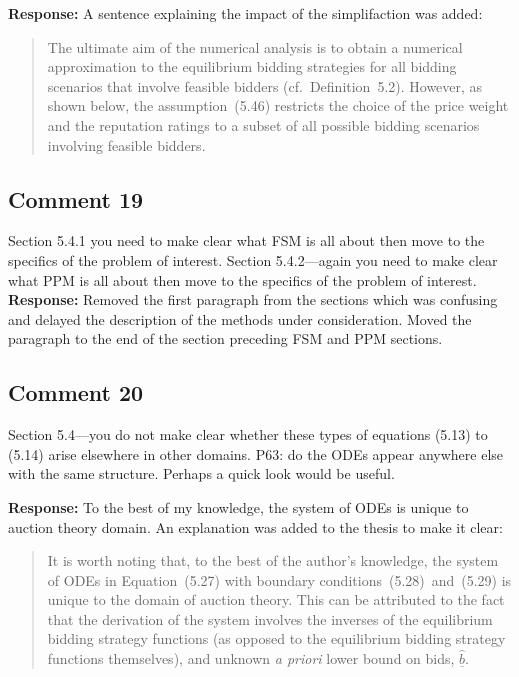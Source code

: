 \documentclass[10pt,a4paper,notitlepage]{article}
\numberwithin{equation}{section}
\begin{document}
\textbf{Response:}
A sentence explaining the impact of the simplifaction was added:
\begin{quote}
The ultimate aim of the numerical analysis is to obtain a numerical approximation to the equilibrium bidding strategies for all bidding scenarios that involve feasible bidders (cf.~Definition~5.2). However, as shown below, the assumption~(5.46) restricts the choice of the price weight and the reputation ratings to a subset of all possible bidding scenarios involving feasible bidders.
\end{quote}

\subsection{Comment 19}
Section 5.4.1 you need to make clear what FSM is all about then move to the specifics of the problem of interest. Section 5.4.2---again you need to make clear what PPM is all about then move to the specifics of the problem of interest.\\[-2ex]

\textbf{Response:}
Removed the first paragraph from the sections which was confusing and delayed the description of the methods under consideration. Moved the paragraph to the end of the section preceding FSM and PPM sections.

\subsection{Comment 20}
Section 5.4---you do not make clear whether these types of equations (5.13) to (5.14) arise elsewhere in other domains. P63: do the ODEs appear anywhere else with the same structure. Perhaps a quick look would be useful.

\textbf{Response:}
To the best of my knowledge, the system of ODEs is unique to auction theory domain. An explanation was added to the thesis to make it clear:
\begin{quote}
It is worth noting that, to the best of the author's knowledge, the system of ODEs in Equation~(5.27) with boundary conditions~(5.28)~and~(5.29) is unique to the domain of auction theory. This can be attributed to the fact that the derivation of the system involves the inverses of the equilibrium bidding strategy functions (as opposed to the equilibrium bidding strategy functions themselves), and unknown \emph{a priori} lower bound on bids, $\underline{\hat{b}}$.
\end{quote}
\end{document}
